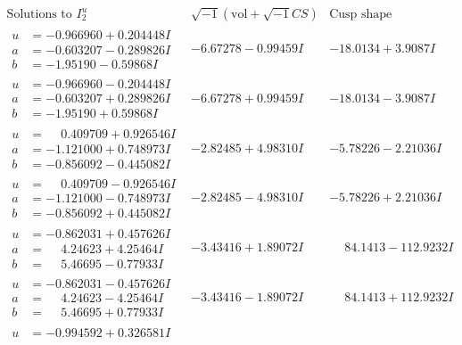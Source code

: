 \documentclass[1p]{elsarticle_modified}
\theoremstyle{definition}
\newcommand{\I}{\sqrt{-1}}
\begin{document}
$$\begin{array}{c|c|c}  
\text{Solutions to }I^u_{2}& \I (\text{vol} + \sqrt{-1}CS) & \text{Cusp shape}\\
 \hline 
\begin{aligned}
u &= -0.966960 + 0.204448 I \\
a &= -0.603207 - 0.289826 I \\
b &= -1.95190 - 0.59868 I\end{aligned}
 & -6.67278 - 0.99459 I & -18.0134 + 3.9087 I \\ \hline\begin{aligned}
u &= -0.966960 - 0.204448 I \\
a &= -0.603207 + 0.289826 I \\
b &= -1.95190 + 0.59868 I\end{aligned}
 & -6.67278 + 0.99459 I & -18.0134 - 3.9087 I \\ \hline\begin{aligned}
u &= \phantom{-}0.409709 + 0.926546 I \\
a &= -1.121000 + 0.748973 I \\
b &= -0.856092 - 0.445082 I\end{aligned}
 & -2.82485 + 4.98310 I & -5.78226 - 2.21036 I \\ \hline\begin{aligned}
u &= \phantom{-}0.409709 - 0.926546 I \\
a &= -1.121000 - 0.748973 I \\
b &= -0.856092 + 0.445082 I\end{aligned}
 & -2.82485 - 4.98310 I & -5.78226 + 2.21036 I \\ \hline\begin{aligned}
u &= -0.862031 + 0.457626 I \\
a &= \phantom{-}4.24623 + 4.25464 I \\
b &= \phantom{-}5.46695 - 0.77933 I\end{aligned}
 & -3.43416 + 1.89072 I & \phantom{-}84.1413 - 112.9232 I \\ \hline\begin{aligned}
u &= -0.862031 - 0.457626 I \\
a &= \phantom{-}4.24623 - 4.25464 I \\
b &= \phantom{-}5.46695 + 0.77933 I\end{aligned}
 & -3.43416 - 1.89072 I & \phantom{-}84.1413 + 112.9232 I \\ \hline\begin{aligned}
u &= -0.994592 + 0.326581 I \\

\end{aligned}
\end{array}$$
\end{document}

